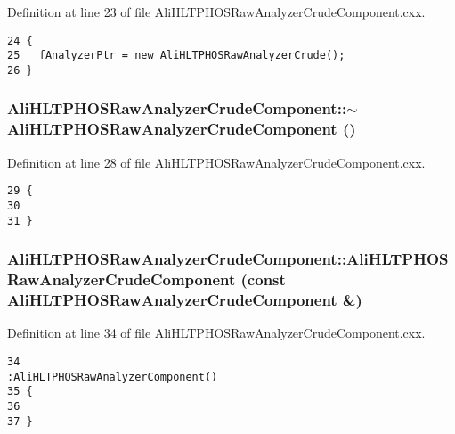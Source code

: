 Definition at line 23 of file Ali\-HLTPHOSRaw\-Analyzer\-Crude\-Component.cxx.

\footnotesize\begin{verbatim}24 {
25   fAnalyzerPtr = new AliHLTPHOSRawAnalyzerCrude();
26 } 
\end{verbatim}\normalsize 


\subsubsection{\setlength{\rightskip}{0pt plus 5cm}Ali\-HLTPHOSRaw\-Analyzer\-Crude\-Component::$\sim${\bf Ali\-HLTPHOSRaw\-Analyzer\-Crude\-Component} ()\hspace{0.3cm}{\tt  [virtual]}}\label{classAliHLTPHOSRawAnalyzerCrudeComponent_a1}




Definition at line 28 of file Ali\-HLTPHOSRaw\-Analyzer\-Crude\-Component.cxx.

\footnotesize\begin{verbatim}29 {
30 
31 }
\end{verbatim}\normalsize 


\subsubsection{\setlength{\rightskip}{0pt plus 5cm}Ali\-HLTPHOSRaw\-Analyzer\-Crude\-Component::Ali\-HLTPHOSRaw\-Analyzer\-Crude\-Component (const {\bf Ali\-HLTPHOSRaw\-Analyzer\-Crude\-Component} \&)}\label{classAliHLTPHOSRawAnalyzerCrudeComponent_a2}




Definition at line 34 of file Ali\-HLTPHOSRaw\-Analyzer\-Crude\-Component.cxx.

\footnotesize\begin{verbatim}34                                                                                                                     :AliHLTPHOSRawAnalyzerComponent()
35 {
36 
37 }
\end{verbatim}\normalsize 




